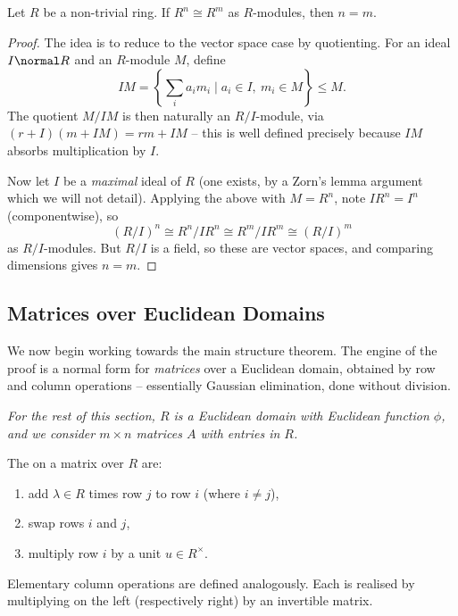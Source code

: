\begin{proposition}
	Let $R$ be a non-trivial ring. If $R^n \cong R^m$ as $R$-modules, then $n = m$.
\end{proposition}
\begin{proof}
	The idea is to reduce to the vector space case by quotienting. For an ideal $I \normal R$ and an $R$-module $M$, define
	$$
	IM = \left\{\textstyle\sum_i a_i m_i \mid a_i \in I,\ m_i \in M\right\} \leq M.
	$$
	The quotient $M/IM$ is then naturally an $R/I$-module, via $(r + I)(m + IM) = rm + IM$ -- this is well defined precisely because $IM$ absorbs multiplication by $I$.

	Now let $I$ be a \emph{maximal} ideal of $R$ (one exists, by a Zorn's lemma argument which we will not detail). Applying the above with $M = R^n$, note $I R^n = I^n$ (componentwise), so
	$$
	(R/I)^n \cong R^n / I R^n \cong R^m/I R^m \cong (R/I)^m
	$$
	as $R/I$-modules. But $R/I$ is a field, so these are vector spaces, and comparing dimensions gives $n = m$.
\end{proof}

\subsection{Matrices over Euclidean Domains}

We now begin working towards the main structure theorem. The engine of the proof is a normal form for \emph{matrices} over a Euclidean domain, obtained by row and column operations -- essentially Gaussian elimination, done without division.

\emph{For the rest of this section, $R$ is a Euclidean domain with Euclidean function $\phi$, and we consider $m \times n$ matrices $A$ with entries in $R$.}

\begin{definition}
	The  on a matrix over $R$ are:
	\begin{enumerate}[label=(\roman*)]
		\item add $\lambda \in R$ times row $j$ to row $i$ (where $i \neq j$),
		\item swap rows $i$ and $j$,
		\item multiply row $i$ by a unit $u \in R^{\times}$.
	\end{enumerate}
	Elementary column operations are defined analogously. Each is realised by multiplying on the left (respectively right) by an invertible matrix.
\end{definition}

